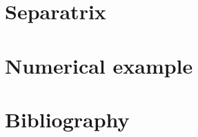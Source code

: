 \documentclass[9pt, numbers]{beamer}
\begin{document}
	

	\section{Separatrix}
	

	\section{Numerical example}
	

	\section{Bibliography}
	
\end{document}
